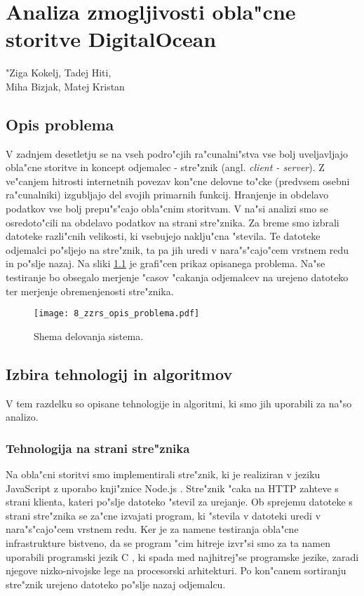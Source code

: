 \chapter[Analiza zmogljivosti obla"cne storitve DigitalOcean]{Analiza zmogljivosti obla"cne storitve DigitalOcean}

\pagestyle{fancy}
\fancyhf{}
\fancyhead[LE,RO]{\thepage}
\fancyhead[RE,LO]{\leftmark}
\lstset{language=C}

\huge "Ziga Kokelj, Tadej Hiti,\\Miha Bizjak, Matej Kristan
\normalsize
\bigskip

\section{Opis problema} \label{8_opis_problema}
\noindent V zadnjem desetletju se na vseh podro"cjih ra"cunalni"stva vse bolj uveljavljajo obla"cne storitve in koncept odjemalec - stre"znik (angl. \textit{client - server}). Z ve"canjem hitrosti internetnih povezav kon"cne delovne to"cke (predvsem osebni ra"cunalniki) izgubljajo del svojih primarnih funkcij. Hranjenje in obdelavo podatkov vse bolj prepu"s"cajo obla"cnim storitvam. V na"si analizi smo se osredoto"cili na obdelavo podatkov na strani stre"znika. Za breme smo izbrali datoteke razli"cnih velikosti, ki vsebujejo naklju"cna "stevila. Te datoteke odjemalci po"sljejo na stre"znik, ta pa jih uredi v nara"s"cajo"cem vrstnem redu in po"slje nazaj. Na sliki \ref{8_opis_problema} je grafi"cen prikaz opisanega problema. Na"se testiranje bo obsegalo merjenje  "casov "cakanja  odjemalcev na urejeno datoteko ter merjenje obremenjenosti stre"znika. 

\begin{figure}
  \centering
    \texttt{[image: 8\_zzrs\_opis\_problema.pdf]}
  \caption{Shema delovanja sistema.}
  \label{8_opis_problema}
\end{figure}


\section{Izbira tehnologij in algoritmov}
V tem razdelku so opisane tehnologije in algoritmi, ki smo jih uporabili za na"so analizo.


\subsection{Tehnologija na strani stre"znika }
Na obla"cni storitvi smo implementirali stre"znik, ki je realiziran v jeziku JavaScript \cite{8_js} z uporabo knji"znice Node.js \cite{8_node}. Stre"znik "caka na HTTP zahteve s strani klienta, kateri po"slje datoteko "stevil za urejanje. Ob sprejemu datoteke s strani stre"znika se za"cne izvajati program, ki "stevila v datoteki uredi v nara"s"cajo"cem vrstnem redu. Ker je za namene testiranja obla"cne infrastrukture bistveno, da se program "cim hitreje izvr"si smo za ta namen uporabili programski jezik C \cite{8_c}, ki spada med najhitrej"se programske jezike, zaradi njegove nizko-nivojske lege na procesorski arhitekturi. Po kon"canem sortiranju stre"znik urejeno datoteko po"slje nazaj odjemalcu.

